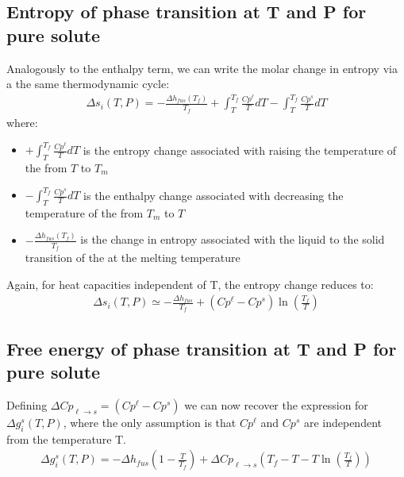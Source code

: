 \documentclass[letterpaper,10pt,english]{jupyterBook}
\begin{document}
\subsection{Entropy of phase transition at T and P for pure solute}
\label{\detokenize{Solubility:entropy-of-phase-transition-at-t-and-p-for-pure-solute}}
\sphinxAtStartPar
Analogously to the enthalpy term, we can write the molar change in entropy via a the same thermodynamic cycle:
\begin{equation*}
\begin{split}
\Delta{s}_i(T,P)=-\frac{\Delta{h_{fus}\left(T_f\right)}}{T_f}+\int_T^{T_f}\frac{Cp^{\ell}}{T}dT-\int_T^{T_f}\frac{Cp^{s}}{T}dT 
\end{split}
\end{equation*}
\sphinxAtStartPar
where:
\begin{itemize}
\item {} 
\sphinxAtStartPar
\(+\int_T^{T_f}\frac{Cp^{\ell}}{T}dT\) is the entropy change associated with raising the temperature of the  from \(T\) to \(T_m\)

\item {} 
\sphinxAtStartPar
\(-\int_T^{T_f}\frac{Cp^{s}}{T}dT \) is the enthalpy change associated with decreasing the temperature of the  from \(T_m\) to \(T\)

\item {} 
\sphinxAtStartPar
\(-\frac{\Delta{h_{fus}\left(T_f\right)}}{T_f}\) is the change in entropy associated with the liquid to the solid transition of the  at the melting temperature

\end{itemize}

\sphinxAtStartPar
Again, for heat capacities independent of T, the entropy change reduces to:
\begin{equation*}
\begin{split}
\Delta{s}_i(T,P) \simeq -\frac{\Delta{h_{fus}}}{T_f}+\left(Cp^{\ell}-Cp^{s}\right)\ln{\left(\frac{T_f}{T}\right)}
\end{split}
\end{equation*}

\subsection{Free energy of phase transition at T and P for pure solute}
\label{\detokenize{Solubility:free-energy-of-phase-transition-at-t-and-p-for-pure-solute}}
\sphinxAtStartPar
Defining \(\Delta{Cp}_{\ell\rightarrow{s}}=\left(Cp^{\ell}-Cp^{s}\right)\) we can now recover the expression for \(\Delta{g}_i^s(T,P)\), where the only assumption is that \(Cp^{\ell}\) and \(Cp^{s}\) are independent from the temperature T.
\begin{equation*}
\begin{split}
\Delta{g}_i^s(T,P)=-\Delta{h_{fus}\left(1-\frac{T}{T_f}\right)}+\Delta{Cp}_{\ell\rightarrow{s}}\left(T_f-T-T\ln{\left(\frac{T_f}{T}\right)}\right)
\end{split}
\end{equation*}
\end{document}

